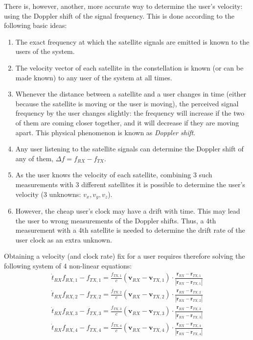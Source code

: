 There is, however, another, more accurate way to determine the user's velocity:
using the Doppler shift of the signal frequency. This is done according to the
following basic ideas:
%
\begin{enumerate}

\item The exact frequency at which the satellite signals are emitted is known 
to the users of the system.

\item The velocity vector of each satellite in the constellation is known (or
can be made known) to any user of the system at all times.

\item Whenever the distance between a satellite and a user changes in time 
(either because the satellite is moving or the user is moving),
the perceived signal frequency by the user changes slightly: the frequency 
will increase if the two of them are coming closer together, and it will 
decrease if they are moving apart. This physical phenomenon is known as 
\emph{Doppler shift}.

\item Any user listening to the satellite signals can determine the Doppler 
shift of any of them, $\Delta f = f_{RX} - f_{TX}$.

\item As the user knows the velocity of each satellite, combining 3 such 
measurements with 3 different satellites 
it is possible to determine the user's velocity (3 unknowns: $v_x,v_y,v_z$).

\item However, the cheap user's clock may have a drift with time. This may
lead the user to wrong measurements of the Doppler shifts. Thus, a 4th 
measurement with a 4th satellite is needed to determine the drift rate of the 
user clock as an extra unknown.

\end{enumerate} 
%
Obtaining a velocity (and clock rate) fix for a user requires therefore
solving the following system of 4 non-linear equations:
%
\begin{align}
\dot{t}_{RX}f_{RX,1}-f_{TX,1} = \frac{f_{TX,1}}{c} (\bm v_{RX}-\bm v_{TX,1}) 
\cdot \frac{\bm r_{RX}-\bm r_{TX,1}}{\left|\bm r_{RX}-\bm r_{TX,1}\right|}
\\
\dot{t}_{RX}f_{RX,2}-f_{TX,2} = \frac{f_{TX,2}}{c} (\bm v_{RX}-\bm v_{TX,2}) 
\cdot \frac{\bm r_{RX}-\bm r_{TX,2}}{\left|\bm r_{RX}-\bm r_{TX,2}\right|}
\\
\dot{t}_{RX}f_{RX,3}-f_{TX,3} = \frac{f_{TX,3}}{c} (\bm v_{RX}-\bm v_{TX,3}) 
\cdot \frac{\bm r_{RX}-\bm r_{TX,3}}{\left|\bm r_{RX}-\bm r_{TX,3}\right|}
\\
\dot{t}_{RX}f_{RX,4}-f_{TX,4} = \frac{f_{TX,4}}{c} (\bm v_{RX}-\bm v_{TX,4}) 
\cdot \frac{\bm r_{RX}-\bm r_{TX,4}}{\left|\bm r_{RX}-\bm r_{TX,4}\right|}
\end{align}
